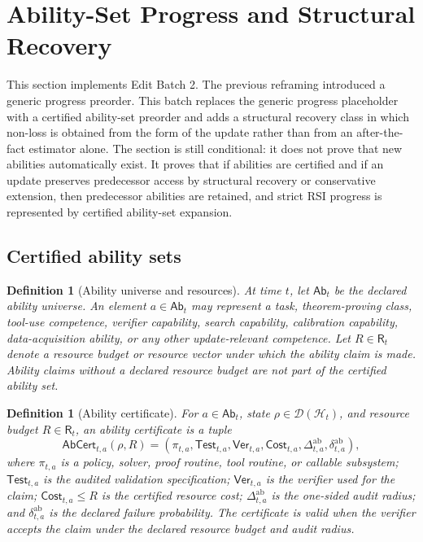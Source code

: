 \documentclass[11pt]{article}
\newtheorem{definition}[theorem]{Definition}
\newcommand{\D}{\mathcal{D}}
\newcommand{\Hcal}{\mathcal{H}}
\newcommand{\1}{\mathbf{1}}
\begin{document}
\section{Ability-Set Progress and Structural Recovery}
\label{sec:ability_set_progress_structural_recovery}

This section implements Edit Batch 2.  The previous reframing introduced a generic progress preorder.  This batch replaces the generic progress placeholder with a certified ability-set preorder and adds a structural recovery class in which non-loss is obtained from the form of the update rather than from an after-the-fact estimator alone.  The section is still conditional: it does not prove that new abilities automatically exist.  It proves that if abilities are certified and if an update preserves predecessor access by structural recovery or conservative extension, then predecessor abilities are retained, and strict RSI progress is represented by certified ability-set expansion.

\subsection{Certified ability sets}

\begin{definition}[Ability universe and resources]
\label{def:ability_universe_resources}
At time \(t\), let \(\mathsf{Ab}_t\) be the declared ability universe.  An element \(a\in\mathsf{Ab}_t\) may represent a task, theorem-proving class, tool-use competence, verifier capability, search capability, calibration capability, data-acquisition ability, or any other update-relevant competence.  Let \(R\in\mathsf R_t\) denote a resource budget or resource vector under which the ability claim is made.  Ability claims without a declared resource budget are not part of the certified ability set.
\end{definition}

\begin{definition}[Ability certificate]
\label{def:ability_certificate}
For \(a\in\mathsf{Ab}_t\), state \(\rho\in\D(\Hcal_t)\), and resource budget \(R\in\mathsf R_t\), an ability certificate is a tuple
\[
\mathsf{AbCert}_{t,a}(\rho,R)=
(\pi_{t,a},\mathsf{Test}_{t,a},\mathsf{Ver}_{t,a},\mathsf{Cost}_{t,a},\Delta_{t,a}^{\mathrm{ab}},\delta_{t,a}^{\mathrm{ab}}),
\]
where \(\pi_{t,a}\) is a policy, solver, proof routine, tool routine, or callable subsystem; \(\mathsf{Test}_{t,a}\) is the audited validation specification; \(\mathsf{Ver}_{t,a}\) is the verifier used for the claim; \(\mathsf{Cost}_{t,a}\le R\) is the certified resource cost; \(\Delta_{t,a}^{\mathrm{ab}}\) is the one-sided audit radius; and \(\delta_{t,a}^{\mathrm{ab}}\) is the declared failure probability.  The certificate is valid when the verifier accepts the claim under the declared resource budget and audit radius.
\end{definition}
\end{document}

